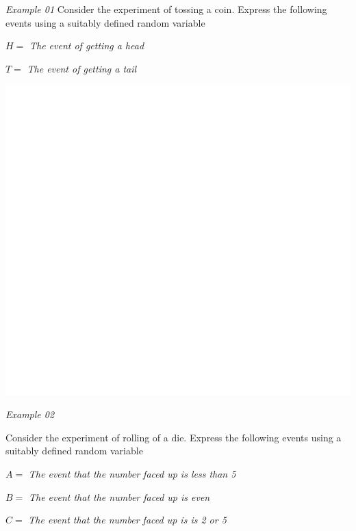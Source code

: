 \documentclass[]{book}
\begin{document}
\emph{Example 01}
Consider the experiment of tossing a coin. Express the following events using a suitably defined random variable

\(H=\) \emph{The event of getting a head}

\(T=\) \emph{The event of getting a tail}

\begin{center}\includegraphics[width=1\linewidth]{figure/Ch1box1-1} \end{center}

\emph{Example 02}

Consider the experiment of rolling of a die. Express the following events using a suitably defined random variable

\(A=\) \emph{The event that the number faced up is less than 5}

\(B=\) \emph{The event that the number faced up is even}

\(C=\) \emph{The event that the number faced up is is 2 or 5}
\end{document}

